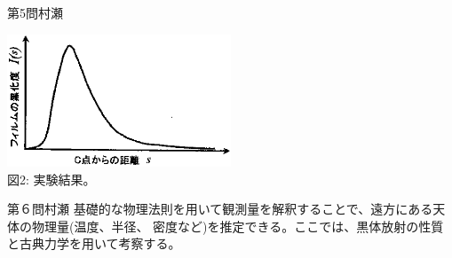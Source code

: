 \begin{question}{第5問}{村瀬}
\begin{center}
\end{center}
\begin{center}
  \includegraphics[width=0.5\textwidth]{2007physQ5_2r.eps}\\図2: 実験結果。
\end{center}
\end{question}

\begin{question}{第６問}{村瀬}
基礎的な物理法則を用いて観測量を解釈することで、遠方にある天体の物理量(温度、半径、
密度など)を推定できる。ここでは、黒体放射の性質と古典力学を用いて考察する。


\end{question}
